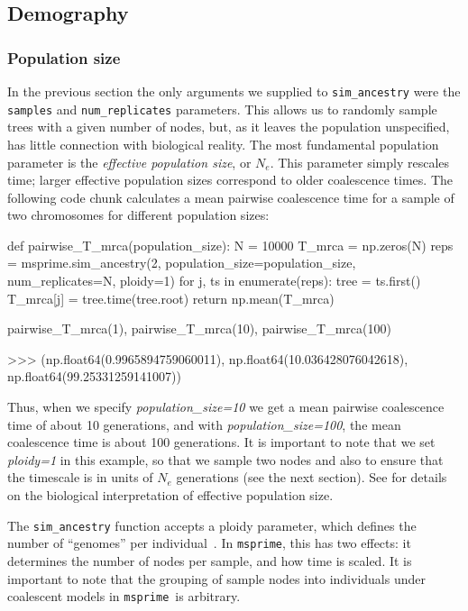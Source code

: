 \documentclass[graybox]{svmult}
\newcommand{\msprime}[0]{\texttt{msprime}}
\begin{document}
\subsection{Demography}\label{Demography}

\subsubsection{Population size}\label{population-models}

In the previous section the only arguments we supplied to
\texttt{sim\_ancestry} were the \texttt{samples} and
\texttt{num\_replicates} parameters. This allows us to randomly sample
trees with a given number of nodes, but, as it leaves the population
unspecified, has little connection with
biological reality. The most fundamental population parameter is the \emph{effective population size}, or
\(N_e\). This parameter simply rescales time; larger effective
population sizes correspond to older coalescence times. The following code chunk
calculates a mean pairwise coalescence time for a sample of two chromosomes
for different population sizes:

\begin{pythoncode}
def pairwise_T_mrca(population_size):
    N = 10000
    T_mrca = np.zeros(N)
    reps = msprime.sim_ancestry(2, population_size=population_size,
        num_replicates=N, ploidy=1)
    for j, ts in enumerate(reps):
        tree = ts.first()
        T_mrca[j] = tree.time(tree.root)
    return np.mean(T_mrca)

pairwise_T_mrca(1), pairwise_T_mrca(10), pairwise_T_mrca(100)

>>> (np.float64(0.9965894759060011),
     np.float64(10.036428076042618),
     np.float64(99.25331259141007))

\end{pythoncode}

Thus, when we specify \emph{population\_size=10} we get a mean pairwise coalescence time of about
10 generations, and with \emph{population\_size=100}, the mean coalescence time is about
100 generations. It is important to note that we set \emph{ploidy=1} in
this example, so that we sample two nodes and also to ensure that the timescale
is in units of $N_e$ generations (see the next section).
See \cite{wakely2008coalescent} for details on the
biological interpretation of effective population size.

\label{ploidy}
The \texttt{sim\_ancestry} function accepts a ploidy parameter, which defines
the number of ``genomes'' per individual~\cite{wong2024general}.
In \msprime, this has two effects: it determines the number of nodes
per sample, and how time is scaled. It is important to note that 
the grouping of sample nodes into individuals under coalescent 
models in \msprime\ is arbitrary.
\end{document}
